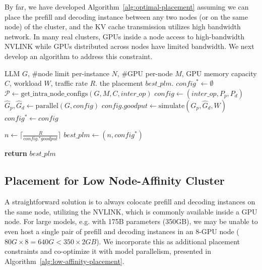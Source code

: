 By far, we have developed Algorithm~\ref{alg:optimal-placement} assuming we can place the prefill and decoding instance between any two nodes (or on the same node) of the cluster, and the KV cache transmission utilizes high bandwidth network. In many real clusters, GPUs inside a node access to high-bandwidth NVLINK while GPUs distributed across nodes have limited bandwidth. We next develop an algorithm to address this constraint.

\begin{algorithm}[t!]
\caption{Low Node-Affinity Placement Algorithm}\label{alg:low-affinity-placement}
\begin{algorithmic}
\Require LLM $G$, \#node limit per-instance $N$, \#GPU per-node $M$, GPU memory capacity $C$, workload $W$, traffic rate $R$.
\Ensure the placement $\mathit{best\_plm}.$ 
    \State $\mathit{config}^{*} \leftarrow \emptyset$
        \State $\mathcal{P} \leftarrow \text{get\_intra\_node\_configs}(G, M, C, \mathit{inter\_op})$
                    \State $\mathit{config} \leftarrow (\mathit{inter\_op}, P_p, P_d)$
                    \State $\hat{G}_p, \hat{G}_d \leftarrow \text{parallel}(G, \mathit{config})$
                    \State $\mathit{config.goodput} \leftarrow \text{simulate}(\hat{G}_p, \hat{G}_d, W)$
                            \State $\mathit{config^{*}} \leftarrow \mathit{config}$
                        \EndIf
                \EndIf
            \EndFor
        \EndFor
    \EndFor
    
    \State $n \leftarrow \lceil \frac{R}{\mathit{config.^{*}goodput}} \rceil$ 
    \State $\mathit{best\_plm} \leftarrow (n, \mathit{config^{*}})$

\State \textbf{return} $\mathit{best\_plm}$
\end{algorithmic}
\end{algorithm}

\subsection{Placement for Low Node-Affinity Cluster}
\label{subsec:practical_placement}
A straightforward solution is to always colocate prefill and decoding instances on the same node, utilizing the NVLINK, which is commonly available inside a GPU node.
For large models, e.g. with 175B parameters (350GB), we may be unable to even host a single pair of prefill and decoding instances in an 8-GPU node ($80G \times 8 = 640G < 350 \times 2 GB $). We incorporate this as additional placement constraints and co-optimize it with model parallelism, presented in Algorithm~\ref{alg:low-affinity-placement}.


